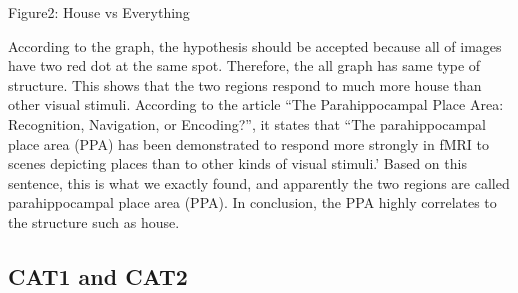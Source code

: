 \documentclass[11pt]{article}
\begin{document}
\begin{housevsface}
  \centering
    \caption{Figure2: House vs Everything}
           
           
According to the graph, the hypothesis should be accepted because all of images have two red dot at the same spot. Therefore, the all graph has same type of structure. This shows that the two regions respond to much more house than other visual stimuli. According to the article “The Parahippocampal Place Area: Recognition, Navigation, or Encoding?”, it states that “The parahippocampal place area (PPA) has been demonstrated to respond more strongly in fMRI to scenes depicting places than to other kinds of visual stimuli.’ Based on this sentence, this is what we exactly found, and apparently the two regions are called parahippocampal place area (PPA). In conclusion, the PPA highly correlates to the structure such as house.
\end{housevsface}


\subsection{CAT1 and CAT2}
\end{document}

